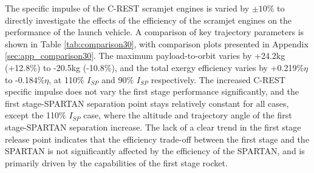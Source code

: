 The specific impulse of the C-REST scramjet engines is varied by $\pm10\%$ to directly investigate the effects of the efficiency of the scramjet engines on the performance of the launch vehicle. A comparison of key trajectory parameters is shown in Table \ref{tab:comparison30}, with comparison plots presented in Appendix \ref{sec:app_comparison30}. The maximum payload-to-orbit varies by +24.2kg (+12.8\%) to -20.5kg (-10.8\%), and the total exergy efficiency varies by +0.219\%$\eta$ to -0.184\%$\eta$, at 110\% $I_{SP}$ and 90\% $I_{SP}$ respectively. 
The increased C-REST specific impulse does not vary the first stage performance significantly, and the first stage-SPARTAN separation point stays relatively constant for all cases, except the 110\% $I_{SP}$ case, where the altitude and trajectory angle of the first stage-SPARTAN separation increase.   
The lack of a clear trend in the first stage release point indicates that the efficiency trade-off between the first stage and the SPARTAN is not significantly affected by the efficiency of the SPARTAN, and is primarily driven by the capabilities of the first stage rocket. 

